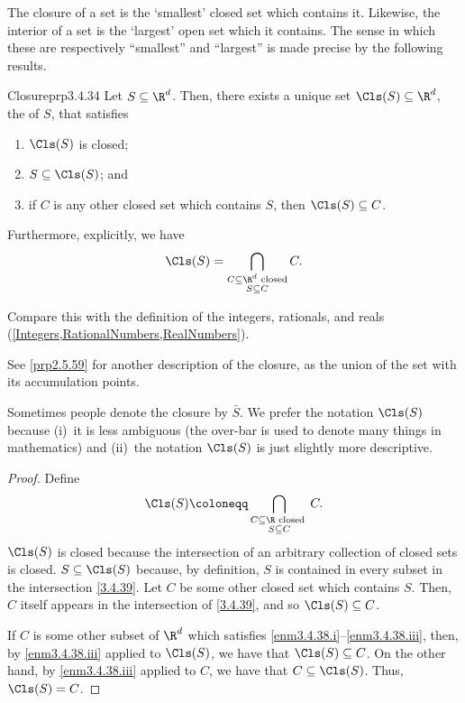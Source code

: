 The closure of a set is the `smallest' closed set which contains it.  Likewise, the interior of a set is the `largest' open set which it contains.  The sense in which these are respectively ``smallest'' and ``largest'' is made precise by the following results.
\begin{prp}{Closure}{prp3.4.34}
Let $S\subseteq \R ^d$.  Then, there exists a unique set $\Cls (S)\subseteq \R ^d$, the  of $S$, that satisfies
\begin{enumerate}
\item \label{enm3.4.38.i}$\Cls (S)$ is closed;
\item \label{enm3.4.38.ii}$S\subseteq \Cls (S)$; and
\item \label{enm3.4.38.iii}if $C$ is any other closed set which contains $S$, then $\Cls (S)\subseteq C$.
\end{enumerate}
Furthermore, explicitly, we have
\begin{equation}
\Cls (S)=\bigcap _{\substack{C\subseteq \R ^d\text{ closed} \\ S\subseteq C}}C.
\end{equation}
\begin{rmk}
Compare this with the definition of the integers, rationals, and reals (\cref{Integers,RationalNumbers,RealNumbers}).
\end{rmk}
\begin{rmk}
See \cref{prp2.5.59} for another description of the closure, as the union of the set with its accumulation points.
\end{rmk}
\begin{rmk}
Sometimes people denote the closure by $\bar{S}$.  We prefer the notation $\Cls (S)$ because (i)~it is less ambiguous (the over-bar is used to denote many things in mathematics) and (ii)~the notation $\Cls (S)$ is just slightly more descriptive.
\end{rmk}
\begin{proof}
Define
\begin{equation}\label{3.4.39}
\Cls (S)\coloneqq \bigcap _{\substack{C\subseteq \R \text{ closed } \\ S\subseteq C}}C.
\end{equation}
$\Cls (S)$ is closed because the intersection of an arbitrary collection of closed sets is closed.  $S\subseteq \Cls (S)$ because, by definition, $S$ is contained in every subset in the intersection \eqref{3.4.39}.  Let $C$ be some other closed set which contains $S$.  Then, $C$ itself appears in the intersection of \eqref{3.4.39}, and so $\Cls (S)\subseteq C$.

If $C$ is some other subset of $\R ^d$ which satisfies \cref{enm3.4.38.i}--\cref{enm3.4.38.iii}, then, by \cref{enm3.4.38.iii} applied to $\Cls (S)$, we have that $\Cls (S)\subseteq C$.  On the other hand, by \cref{enm3.4.38.iii} applied to $C$, we have that $C\subseteq \Cls (S)$.  Thus, $\Cls (S)=C$.
\end{proof}
\end{prp}
